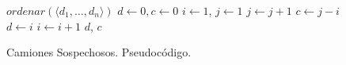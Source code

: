 \begin{center}
\begin{figure}
    \begin{pseudo}
            \State $ordenar(\langle d_1, \ldots, d_n \rangle)$ 
            \State $d \leftarrow 0, c \leftarrow 0$ 
            \State $i \leftarrow 1$, $j \leftarrow 1$ 
             
                 
                    \State $j \leftarrow j + 1$ 
                \EndWhile
                 
                    \State $c \leftarrow j - i$ 
                    \State $d \leftarrow i$ 
                \EndIf
                \State $i \leftarrow i + 1$ 
            \EndWhile
            \Return $d$, $c$
        \EndProcedure
    \end{pseudo}
    \caption{Camiones Sospechosos. Pseudocódigo.}
    \label{problema1-pseudo}
\end{figure}
\end{center}